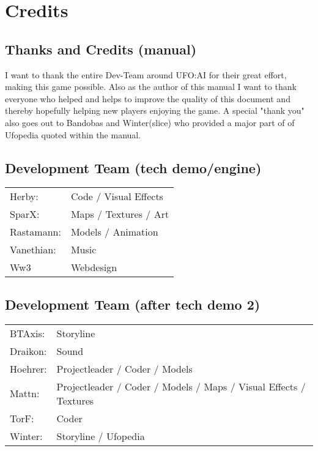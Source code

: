 \newpage

\section{Credits}
\subsection{Thanks and Credits (manual)}
I want to thank the entire Dev-Team around UFO:AI for their great effort, making this game possible. Also as the author of this manual I want to thank everyone who helped and helps to improve the quality of this document and thereby hopefully helping new players enjoying the game. A special "thank you" also goes out to Bandobas and Winter(slice) who provided a major part of of Ufopedia quoted within the manual.

\subsection{Development Team (tech demo/engine)}
\begin{tabular}{ll}
Herby:  			&  Code / Visual Effects	\\ 
SparX:  			&  Maps / Textures / Art	\\ 
Rastamann:  	&  Models / Animation		\\ 
Vanethian:  		&  Music							\\ 
Ww3					&	 Webdesign					\\
\end{tabular} 

\subsection{Development Team (after tech demo 2)}

\begin{tabular}{ll}
BTAxis:  	& Storyline \\
Draikon:	& Sound \\	
Hoehrer:  	& Projectleader / Coder / Models \\
Mattn:  	& Projectleader / Coder / Models / Maps / Visual Effects / Textures \\
TorF:  		& Coder \\
Winter:		& Storyline / Ufopedia \\
\end{tabular} 

